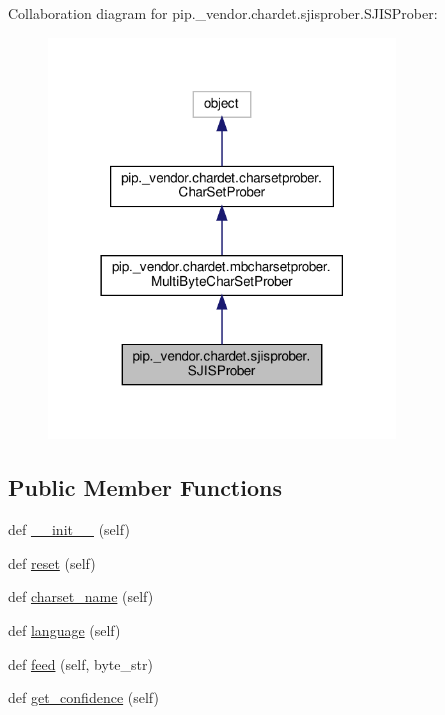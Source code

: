 Collaboration diagram for pip.\+\_\+vendor.\+chardet.\+sjisprober.\+S\+J\+I\+S\+Prober\+:
\nopagebreak
\begin{figure}[H]
\begin{center}
\leavevmode
\includegraphics[width=261pt]{classpip_1_1__vendor_1_1chardet_1_1sjisprober_1_1SJISProber__coll__graph}
\end{center}
\end{figure}
\subsection*{Public Member Functions}
\begin{DoxyCompactItemize}
\item 
def \hyperlink{classpip_1_1__vendor_1_1chardet_1_1sjisprober_1_1SJISProber_acda929b60de9d576beae347c88751221}{\+\_\+\+\_\+init\+\_\+\+\_\+} (self)
\item 
def \hyperlink{classpip_1_1__vendor_1_1chardet_1_1sjisprober_1_1SJISProber_a45ca136c3fed531ab3975cb718a070ae}{reset} (self)
\item 
def \hyperlink{classpip_1_1__vendor_1_1chardet_1_1sjisprober_1_1SJISProber_a1986f0629659b1ec26c3ae0132baecd9}{charset\+\_\+name} (self)
\item 
def \hyperlink{classpip_1_1__vendor_1_1chardet_1_1sjisprober_1_1SJISProber_a8365c10e80d3a5ae5bbdf036335ff219}{language} (self)
\item 
def \hyperlink{classpip_1_1__vendor_1_1chardet_1_1sjisprober_1_1SJISProber_a95af2daa6b9396f65da6f6197a1dbfb8}{feed} (self, byte\+\_\+str)
\item 
def \hyperlink{classpip_1_1__vendor_1_1chardet_1_1sjisprober_1_1SJISProber_add3882c4099c37e09006b5fe701984a0}{get\+\_\+confidence} (self)
\end{DoxyCompactItemize}
